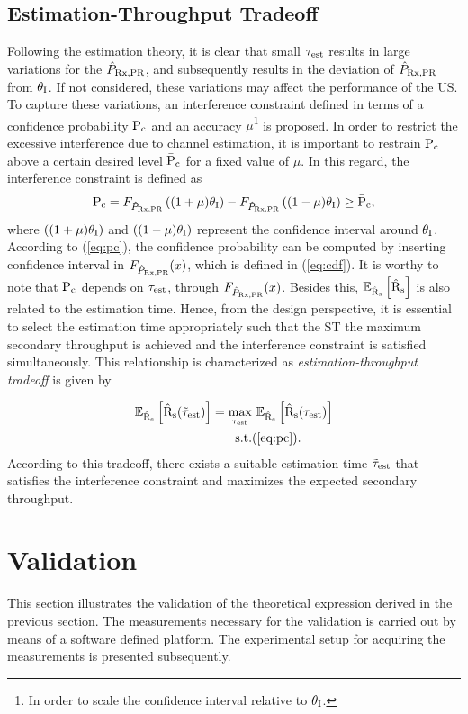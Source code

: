 \subsection{Estimation-Throughput Tradeoff}
Following the estimation theory, it is clear that small $\tau_{\text{est}}$ results in large variations for the $\hat{P}_{\text{Rx,PR}}$, and subsequently results in the deviation of $\hat{P}_{\text{Rx,PR}}$ from $\theta_{\text{I}}$. If not considered, these variations may affect the performance of the US. To capture these variations, an interference constraint defined in terms of a confidence probability $\text{P}_{\text{c}}$ and an accuracy $\mu$\footnote{In order to scale the confidence interval relative to $\theta_{\text{I}}$.} is proposed. In order to restrict the excessive interference due to channel estimation, it is important to restrain $\text{P}_{\text{c}}$ above a certain desired level $\bar{\text{P}}_{\text{c}}$ for a fixed value of $\mu$. In this regard, the interference constraint is defined as
\begin{align}
\text{P}_{\text{c}} = F_{\hat{P}_{\text{Rx,PR}}} \left( {(1 + \mu) \theta_{\text{I}}}\right)  - F_{\hat{P}_{\text{Rx,PR}}} \left({(1 - \mu) \theta_{\text{I}}} \right) \ge \bar{\text{P}}_{\text{c}}, \label{eq:pc} 
\end{align}
where $\left( {(1 + \mu) \theta_{\text{I}}}\right)$ and $\left({(1 - \mu) \theta_{\text{I}}} \right)$ represent the confidence interval around $\theta_{\text{I}}$. According to (\ref{eq:pc}), the confidence probability can be computed by inserting confidence interval in $F_{\hat{P}_{\text{Rx,PR}}}(x)$, which is defined in (\ref{eq:cdf}). It is worthy to note that $\text{P}_{\text{c}}$ depends on $\tau_{\text{est}}$, through $F_{\hat{P}_{\text{Rx,PR}}}(x)$. Besides this, ${\mathbb E}_{\hat{\text{{R}}}_{\text{s}}}\left[ \hat{\text{{R}}}_{\text{s}} \right]$ is also related to the estimation time. Hence, from the design perspective, it is essential to select the estimation time appropriately such that the ST the maximum secondary throughput is achieved and the interference constraint is satisfied simultaneously. This relationship is characterized as \textit{estimation-throughput tradeoff} is given by 

\begin{align}
{\mathbb E}_{\hat{\text{{R}}}_{\text{s}}}\left[ \hat{\text{{R}}}_{\text{s}}(\tilde{\tau}_{\text{est}}) \right] = \operatorname*{max}_{\tau_{\text{est}}}  & \text{      } {\mathbb E}_{\hat{\text{{R}}}_{\text{s}}}\left[ \hat{\text{{R}}}_{\text{s}}(\tau_{\text{est}}) \right] 
 \label{eq:sys} \\
\text{s.t.} & (\ref{eq:pc}). \nonumber  
\end{align}
According to this tradeoff, there exists a suitable estimation time $\tilde{\tau}_{\text{est}}$ that satisfies the interference constraint and maximizes the expected secondary throughput. 

\section{Validation}
\label{ssec:val}
This section illustrates the validation of the theoretical expression derived in the previous section. The measurements necessary for the validation is carried out by means of a software defined platform. The experimental setup for acquiring the measurements is presented subsequently. 
 

